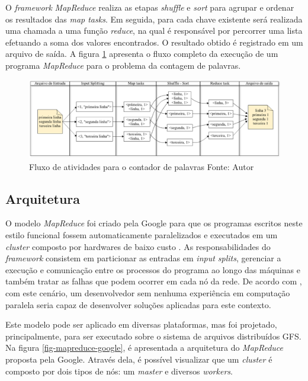 O \textit{framework} \textit{MapReduce} realiza as etapas \textit{shuffle} e \textit{sort} para agrupar e ordenar os resultados das \textit{map tasks}. Em seguida, para cada chave existente será realizada uma chamada a uma função \textit{reduce}, na qual é responsável por percorrer uma lista efetuando a soma dos valores encontrados. O resultado obtido é registrado em um arquivo de saída. A figura \ref{fig-mapreduce-word-count} apresenta o fluxo completo da execução de um programa \textit{MapReduce} para o problema da contagem de palavras.

\begin{figure}[ht!]
	\centering
	\includegraphics[keepaspectratio=true,scale=0.36]
	  {figuras/mapreduce-word-count.eps}
	\caption[Fluxo de atividades para o contador de palavras]{Fluxo de atividades para o contador de palavras
	\protect\linebreak Fonte: Autor}
	\label{fig-mapreduce-word-count}
\end{figure}
\FloatBarrier

\subsection{Arquitetura}

O modelo \textit{MapReduce} foi criado pela Google para que os programas escritos neste estilo funcional fossem automaticamente paralelizados e executados em um \textit{cluster} composto por hardwares de baixo custo \cite{ghemawatMapreduce2008}. As responsabilidades do \textit{framework} consistem em particionar as entradas em \textit{input splits}, gerenciar a execução e comunicação entre os processos do programa ao longo das máquinas e também tratar as falhas que podem ocorrer em cada nó da rede. De acordo com , com este cenário, um desenvolvedor sem nenhuma experiência em computação paralela seria capaz de desenvolver soluções aplicadas para este contexto. 

Este modelo pode ser aplicado em diversas plataformas, mas foi projetado, principalmente, para ser executado sobre o sistema de arquivos distribuídos GFS. Na figura \ref{fig-mapreduce-google}, é apresentada a arquitetura do \textit{MapReduce} proposta pela Google. Através dela, é possível visualizar que um \textit{cluster} é composto por dois tipos de nós: um \textit{master} e diversos \textit{workers}.

